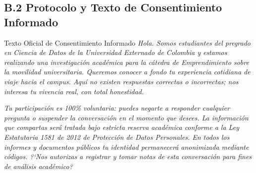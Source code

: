 \documentclass[11pt,a4paper]{article}
\begin{document}
\subsection{B.2 Protocolo y Texto de Consentimiento Informado}
\begin{externadobox}{Texto Oficial de Consentimiento Informado}
\textit{\guillemotleft Hola. Somos estudiantes del pregrado en Ciencia de Datos de la Universidad Externado de Colombia y estamos realizando una investigaci\'on acad\'emica para la c\'atedra de Emprendimiento sobre la movilidad universitaria. Queremos conocer a fondo tu experiencia cotidiana de viaje hacia el campus. Aqu\'i no existen respuestas correctas o incorrectas; nos interesa tu vivencia real, con total honestidad.}

\textit{Tu participaci\'on es 100\% voluntaria: puedes negarte a responder cualquier pregunta o suspender la conversaci\'on en el momento que desees. La informaci\'on que compartas ser\'a tratada bajo estricta reserva acad\'emica conforme a la Ley Estatutaria 1581 de 2012 de Protecci\'on de Datos Personales. En todos los informes y documentos p\'ublicos tu identidad permanecer\'a anonimizada mediante c\'odigos. ?`Nos autorizas a registrar y tomar notas de esta conversaci\'on para fines de an\'alisis acad\'emico?\guillemotright}
\end{externadobox}
\end{document}
